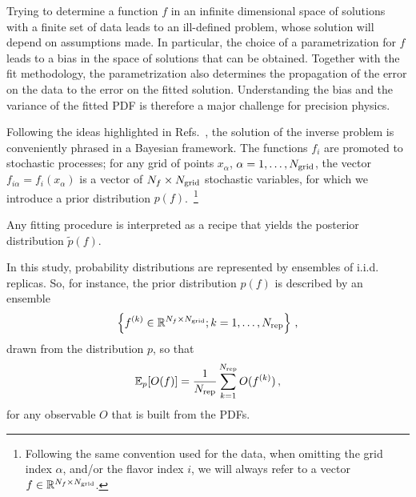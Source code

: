 \documentclass[11pt]{article}
\begin{document}
Trying to determine a function $f$ in an infinite dimensional space of solutions with a finite
set of data leads to an ill-defined problem, whose solution will depend on assumptions made.
In particular, the choice of a parametrization for $f$ leads to a bias in the space
of solutions that can be obtained. Together with the fit methodology, the parametrization also
determines the propagation of the error on the data to the error on the fitted solution. Understanding
the bias and the variance of the fitted PDF is therefore a major challenge for precision physics.

Following the ideas highlighted in Refs.~\cite{DelDebbio:2021whr,Candido:2024hjt}, the solution
of the inverse problem is conveniently phrased in
a Bayesian framework. The functions $f_i$ are promoted to stochastic processes; for any grid
of points $x_{\alpha}$, $\alpha=1, \ldots, N_{\mathrm{grid}}$, the vector $f_{i\alpha}=f_{i}(x_{\alpha})$ is a
vector of $N_{f}\times N_{\mathrm{grid}}$ stochastic variables, for which we introduce a prior distribution $p(f)$.~\footnote{Following
the same convention used for the data, when omitting the grid index $\alpha$, and/or the flavor index $i$, we will always refer to a
vector $f \in \mathbb{R}^{N_{f}\times N_{\mathrm{grid}}}$.}

Any fitting procedure is interpreted as a recipe that yields the posterior distribution
$\tilde{p}(f)$.

In this study, probability distributions are represented by ensembles of i.i.d. replicas.
So, for instance, the prior distribution $p(f)$ is described by an ensemble
\begin{equation}
    \label{eq:RepDef}
    \left\{f^{(k)} \in \mathbb{R}^{N_{f}\times N_{\mathrm{grid}}}; k=1, \ldots, N_{\rm rep}\right\}\, ,
\end{equation}
drawn from the distribution $p$, so that
\begin{equation}
    \label{eq:ReplicaEnsemble}
    \mathbb{E}_{p}[O(f)] = \frac{1}{N_{\rm rep}} \sum_{k=1}^{N_{\rm rep}} O(f^{(k)})\, ,
\end{equation}
for any observable $O$ that is built from the PDFs.
\end{document}
